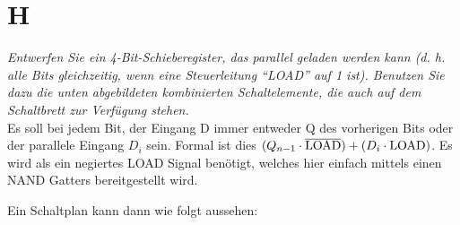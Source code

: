 \section{H}
\textit{Entwerfen Sie ein 4-Bit-Schieberegister, das parallel geladen werden kann (d. h. alle Bits gleichzeitig, wenn eine Steuerleitung “LOAD” auf 1 ist). Benutzen Sie dazu die unten abgebildeten kombinierten Schaltelemente, die auch auf dem Schaltbrett zur Verfügung stehen.}\\

Es soll bei jedem Bit, der Eingang D immer entweder Q des vorherigen Bits oder der parallele Eingang $D_i$ sein. Formal ist dies $(Q_{n-1} \cdot \overline{\mathrm{LOAD}}) + (D_i \cdot \mathrm{LOAD})$. Es wird als ein negiertes LOAD Signal benötigt, welches hier einfach mittels einen NAND Gatters bereitgestellt wird.

Ein Schaltplan kann dann wie folgt aussehen:

